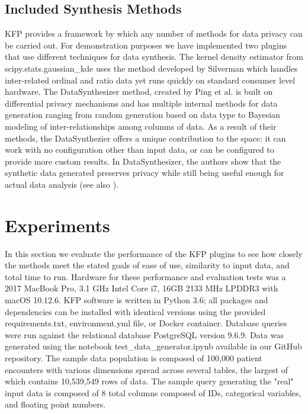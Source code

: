 \documentclass{amia}
\begin{document}
\subsection{Included Synthesis Methods}

KFP provides a framework by which any number of methods for data privacy can be carried out. For demonstration purposes we have implemented two plugins that use different techniques for data synthesis. The kernel density estimator from scipy.stats.gaussian\_kde uses the method developed by Silverman \cite{silverman_density_1986} which handles inter-related ordinal and ratio data yet runs quickly on standard consumer level hardware. The DataSynthesizer method, created by Ping et al. \cite{ping17datasynthesizer} is built on differential privacy mechanisms and has multiple internal methods for data generation ranging from random generation based on data type to Bayesian modeling of inter-relationships among columns of data. As a result of their methods, the DataSynthezier offers a unique contribution to the space: it can work with no configuration other than input data, or can be configured to provide more custom results. In DataSynthesizer, the authors show that the synthetic data generated preserves privacy while still being useful enough for actual data analysis (see also \cite{howe_synthetic_2017}).

\section{Experiments}

In this section we evaluate the performance of the KFP plugins to see how closely the methods meet the stated goals of ease of use, similarity to input data, and total time to run. Hardware for these performance and evaluation tests was a 2017 MacBook Pro, 3.1 GHz Intel Core i7, 16GB 2133 MHz LPDDR3 with macOS 10.12.6. KFP software is written in Python 3.6; all packages and dependencies can be installed with identical versions using the provided requirements.txt, environment.yml file, or Docker container. Database queries were run against the relational database PostgreSQL version 9.6.9. Data was generated using the notebook test\_data\_generator.ipynb available in our GitHub repository. The sample data population is composed of 100,000 patient encounters with various dimensions spread across several tables, the largest of which contains 10,539,549 rows of data. The sample query generating the "real" input data is composed of 8 total columns composed of IDs, categorical variables, and floating point numbers.
\end{document}
